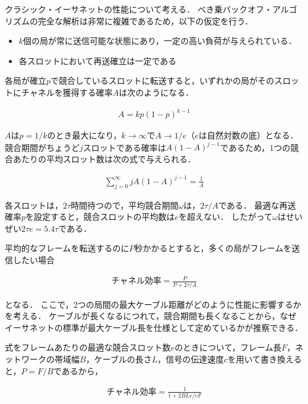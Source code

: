 \documentclass[a4paper]{ltjsarticle}
\providecommand{\tightlist}{%
  \setlength{\itemsep}{0pt}\setlength{\parskip}{0pt}}
\begin{document}
クラシック・イーサネットの性能について考える．
べき乗バックオフ・アルゴリズムの完全な解析は非常に複雑であるため，以下の仮定を行う．

\begin{itemize}
\tightlist
\item
  \(k\)個の局が常に送信可能な状態にあり，一定の高い負荷が与えられている．
\item
  各スロットにおいて再送確立は一定である
\end{itemize}

各局が確立\(p\)で競合しているスロットに転送すると，いずれかの局がそのスロットにチャネルを獲得する確率\(A\)は次のようになる．

\begin{align}
  A = kp(1-p)^{k-1}
\end{align}

\(A\)は\(p=1/k\)のとき最大になり，\(k \to \infty\)で\(A \to 1/e\)（\(e\)は自然対数の底）となる．
競合期間がちょうど\(j\)スロットである確率は\(A(1-A)^{j-1}\)であるため，1つの競合あたりの平均スロット数は次の式で与えられる．

\begin{align}
  \sum^{\infty}_{j=0} jA(1-A)^{j-1} = \frac{1}{A}
\end{align}

各スロットは，\(2 \tau\)時間待つので，平均競合期間\(\omega\)は，\(2 \tau / A\)である．
最適な再送確率\(p\)を設定すると，競合スロットの平均数は\(e\)を超えない．
したがって\(\omega\)はせいぜい\(2 \tau e = 5.4 \tau\)である．

平均的なフレームを転送するのに\(P\)秒かかるとすると，多くの局がフレームを送信したい場合

\begin{align}
  \text{チャネル効率} = \frac{P}{P + 2 \tau / A}
\end{align}

となる．
ここで，2つの局間の最大ケーブル距離がどのように性能に影響するかを考える．
ケーブルが長くなるにつれて，競合期間も長くなることから，なぜイーサネットの標準が最大ケーブル長を仕様として定めているかが推察できる．

式をフレームあたりの最適な競合スロット数\(e\)のときについて，フレーム長\(F\)，ネットワークの帯域幅\(B\)，ケーブルの長さ\(L\)，信号の伝達速度\(c\)を用いて書き換えると，\(P=F/B\)であるから，

\begin{align}
  \text{チャネル効率} = \frac{1}{1+2BLe/cF}
\end{align}
\end{document}
